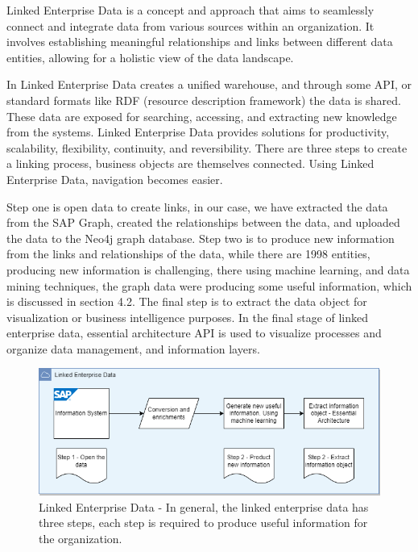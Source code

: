 \documentclass{article}
\begin{document}
Linked Enterprise Data is a concept and approach that aims to seamlessly connect and integrate data from various sources within an organization. It involves establishing meaningful relationships and links between different data entities, allowing for a holistic view of the data landscape.

In Linked Enterprise Data creates a unified warehouse, and through some API, or standard formats like RDF (resource description framework) the data is shared. These data are exposed for searching, accessing, and extracting new knowledge from the systems. Linked Enterprise Data provides solutions for productivity, scalability, flexibility, continuity, and reversibility. There are three steps to create a linking process, business objects are themselves connected. Using Linked Enterprise Data, navigation becomes easier. \parencite{rao2017}

Step one is open data to create links, in our case, we have extracted the data from the SAP Graph, created the relationships between the data, and uploaded the data to the Neo4j graph database. Step two is to produce new information from the links and relationships of the data, while there are 1998 entities, producing new information is challenging, there using machine learning, and data mining techniques, the graph data were producing some useful information, which is discussed in section 4.2. The final step is to extract the data object for visualization or business intelligence purposes. In the final stage of linked enterprise data, essential architecture API is used to visualize processes and organize data management, and information layers.

\begin{figure}[ht!]
    \centering
    \includegraphics[scale=0.5]{linked-enterprise-data}
    \caption{Linked Enterprise Data - 
In general, the linked enterprise data has three steps, each step is required to produce useful information for the organization.
}
    \label{fig:LED}
\end{figure}
\end{document}
